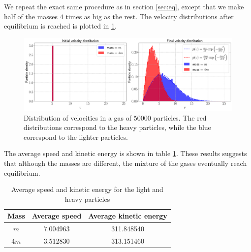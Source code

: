 We repeat the exact same procedure as in section \ref{sec:eq}, except that we make half of the masses $4$ times as big as the rest. The velocity distributions after equilibrium is reached is plotted in \ref{fig:dist_3}.

\begin{figure}[htb]
	\centering
	\includegraphics[width=\textwidth]{../fig/distribution_2}
	\caption{Distribution of velocities in a gas of $50000$ particles. The red distributions correspond to the heavy particles, while the blue correspond to the lighter particles.}
	\label{fig:dist_3}
\end{figure}

The average speed and kinetic energy is shown in table \ref{tab:averages}. These results suggests that although the masses are different, the mixture of the gases eventually reach equilibrium.  

\begin{table}[htb]
	\centering 
	\caption{Average speed and kinetic energy for the light and heavy particles}
	\begin{tabular}{ccc}
		\hline
		\textbf{Mass }& \textbf{Average speed} & \textbf{Average kinetic energy} \\
		\hline 
		$m$   & 7.004963 & 311.848540 \\
		$4m$  & 3.512830 & 313.151460 \\
		\hline 
	\end{tabular}
	\label{tab:averages}
\end{table}
